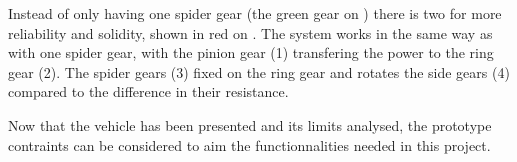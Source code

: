 








Instead of only having one spider gear (the green gear on ) there is two for more reliability and solidity, shown in red on . The system works in the same way as with one spider gear, with the pinion gear (1) transfering the power to the ring gear (2). The spider gears (3) fixed on the ring gear and rotates the side gears (4) compared to the difference in their resistance.

Now that the vehicle has been presented and its limits analysed, the prototype contraints can be considered to aim the functionnalities needed in this project.

